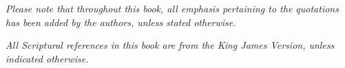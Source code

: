 \thispagestyle{empty}

\vspace*{1cm}

\begin{center}
    \textit{Please note that throughout this book, all emphasis pertaining to the quotations has been added by the authors, unless stated otherwise.}
    
    \textit{All Scriptural references in this book are from the King James Version, unless indicated otherwise.}
\end{center}

\cleardoublepage